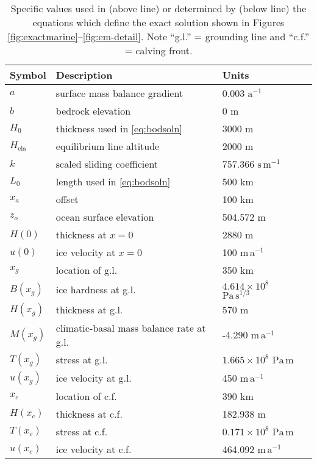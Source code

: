 \documentclass[twocolumn]{igs}
\newcommand{\Hela}{H_{\text{ela}}}
\begin{document}
\begin{table}
\caption{Specific values used in (above line) or determined by (below line) the equations which define the exact solution shown in Figures \ref{fig:exactmarine}--\ref{fig:em-detail}.  Note ``g.l.'' = grounding line and ``c.f.'' = calving front.}\label{tab:exactsoln}

\medskip
\begin{tabular}{llll}
Symbol & Description & Units \\ \hline
$a$ & surface mass balance gradient & 0.003 $\text{a}^{-1}$ \\
$b$ & bedrock elevation & 0 m \\
$H_0$ & thickness used in \eqref{eq:bodsoln} & 3000 m  \\
$\Hela$ & equilibrium line altitude & 2000 m  \\
$k$ & scaled sliding coefficient & 757.366 $\text{s}\,\text{m}^{-1}$ \\
$L_0$ & length used in \eqref{eq:bodsoln} & 500 km  \\
$x_a$ & offset & 100 km  \\
$z_o$ & ocean surface elevation & 504.572 m \\
$H(0)$ & thickness at $x=0$ & 2880 m  \\
$u(0)$ & ice velocity at $x=0$ & 100 $\text{m}\,\text{a}^{-1}$  \\ \hline
$x_g$ & location of g.l. & 350 km  \\
$B(x_g)$ & ice hardness at g.l. & $4.614 \times 10^{8}$ $\text{Pa}\,\text{s}^{1/3}$  \\
$H(x_g)$ & thickness at g.l. & 570 m  \\
$M(x_g)$ & climatic-basal mass balance rate at g.l. & -4.290 $\text{m}\,\text{a}^{-1}$  \\
$T(x_g)$ & stress at g.l. & $1.665 \times 10^{8}$ $\text{Pa}\,\text{m}$  \\
$u(x_g)$ & ice velocity at g.l. & 450 $\text{m}\,\text{a}^{-1}$  \\
$x_c$ & location of c.f. & 390 km  \\
$H(x_c)$ & thickness at c.f. & 182.938 m  \\
$T(x_c)$ & stress at c.f. & $0.171 \times 10^{8}$ $\text{Pa}\,\text{m}$  \\
$u(x_c)$ & ice velocity at c.f. & 464.092 $\text{m}\,\text{a}^{-1}$  \\
\end{tabular}
\end{table}
\end{document}

